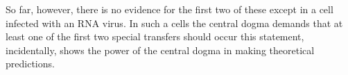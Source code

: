 \documentclass{beamer}
\begin{document}
\begin{frame}
    \begin{exampleblock}{}
        So far, however, there is no evidence for the
        first two of these except in a cell infected with an RNA
        virus. In such a cells the central dogma demands that at
        least one of the first two special transfers should occur this statement, incidentally, shows the power of the
        central dogma in making theoretical predictions.
    \end{exampleblock}
\end{frame}
\end{document}
